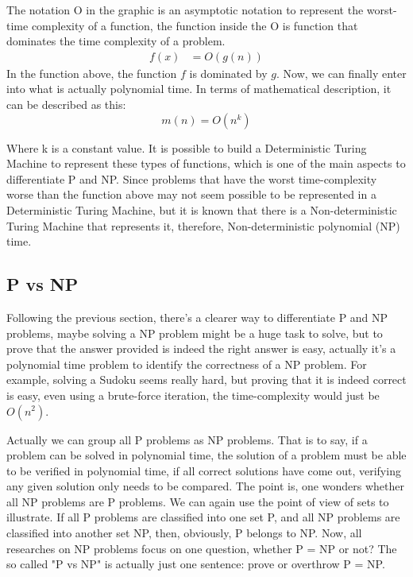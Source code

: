 The notation O in the graphic is an asymptotic notation to represent the worst-time complexity of a function, the function
inside the O is function that dominates the time complexity of a problem.
\begin{align}
f(x) &= O(g(n))
\end{align}
In the function above, the function $f$ is dominated by $g$. 
Now, we can finally enter into what is actually polynomial time. In terms of mathematical description, it can be described as
this: \[m(n) = O(n^k)\]

Where k is a constant value. It is possible to build a Deterministic Turing Machine to represent these types of functions,
which is one of the main aspects to differentiate P and NP. Since problems that have the worst time-complexity worse than the 
function above may not seem possible to be represented in a Deterministic Turing Machine, but it is known that there is a 
Non-deterministic Turing Machine that represents it, therefore, Non-deterministic polynomial (NP) time.



\subsection{P vs NP}

Following the previous section, there's a clearer way to differentiate P and NP problems, maybe solving a NP problem might be 
a huge task to solve, but to prove that the answer provided is indeed the right answer is easy, actually it's a polynomial time
problem to identify the correctness of a NP problem. For example, solving a Sudoku seems really hard, but proving that it is indeed  
correct is easy, even using a brute-force iteration, the time-complexity would just be $O(n^2)$. 

Actually we can group all P problems as NP problems. That is to say, if a problem can be solved in polynomial time, the solution of a 
problem  must be able to be verified in polynomial time, if all correct solutions have come out, verifying any given solution only 
needs to be compared. The point is, one wonders whether all NP problems are P problems. We can again use the point of view of sets 
to illustrate. If all P problems are classified into one set P, and all NP problems are classified into another set NP, then, obviously,
P belongs to NP. Now, all researches on NP problems focus on one question, whether P = NP or not? The so called "P vs NP" is actually 
just one sentence: prove or overthrow  P = NP.

